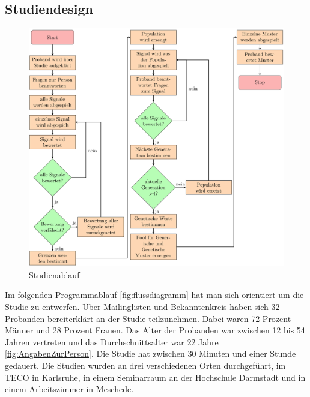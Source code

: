

\subsection{Studiendesign}

\begin{figure}
	\centering
    \includegraphics[width=\textwidth]{pics/analyse/Programmablaufdiagramm.png}
    \caption{Studienablauf}
    \label{fig:flussdiagramm}
\end{figure}

Im folgenden Programmablauf \autoref{fig:flussdiagramm} hat man sich orientiert um die Studie zu entwerfen. 
{\"U}ber Mailinglisten und Bekanntenkreis haben sich 32 Probanden bereiterkl{\"a}rt an der Studie teilzunehmen. 
Dabei waren 72 Prozent M{\"a}nner und 28 Prozent Frauen. 
Das Alter der Probanden war zwischen 12 bis 54 Jahren vertreten und das Durchschnittsalter war 22 Jahre \autoref{fig:AngabenZurPerson}.  
Die Studie hat zwischen 30 Minuten und einer Stunde gedauert.
Die Studien wurden an drei verschiedenen Orten durchgef{\"u}hrt, im TECO in Karlsruhe, in einem Seminarraum an der Hochschule Darmstadt und in einem Arbeitszimmer in Meschede.

